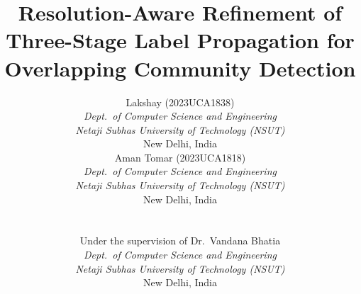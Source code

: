 \documentclass[conference]{IEEEtran}
\begin{document}
\title{Resolution-Aware Refinement of Three-Stage Label Propagation for Overlapping Community Detection}

\author{%
\begin{tabular}[t]{c}
Lakshay (2023UCA1838)\\[0.5ex]
{\small\textit{Dept.\ of Computer Science and Engineering}}\\
{\small\textit{Netaji Subhas University of Technology (NSUT)}}\\
{\small New Delhi, India}
\end{tabular}%
\hspace{2.2cm}%
\begin{tabular}[t]{c}
Aman Tomar (2023UCA1818)\\[0.5ex]
{\small\textit{Dept.\ of Computer Science and Engineering}}\\
{\small\textit{Netaji Subhas University of Technology (NSUT)}}\\
{\small New Delhi, India}
\end{tabular}\\[3ex]
\begin{tabular}[t]{c}
Under the supervision of Dr.\ Vandana Bhatia\\[0.5ex]
{\small\textit{Dept.\ of Computer Science and Engineering}}\\
{\small\textit{Netaji Subhas University of Technology (NSUT)}}\\
{\small New Delhi, India}
\end{tabular}
}

\maketitle
\end{document}
